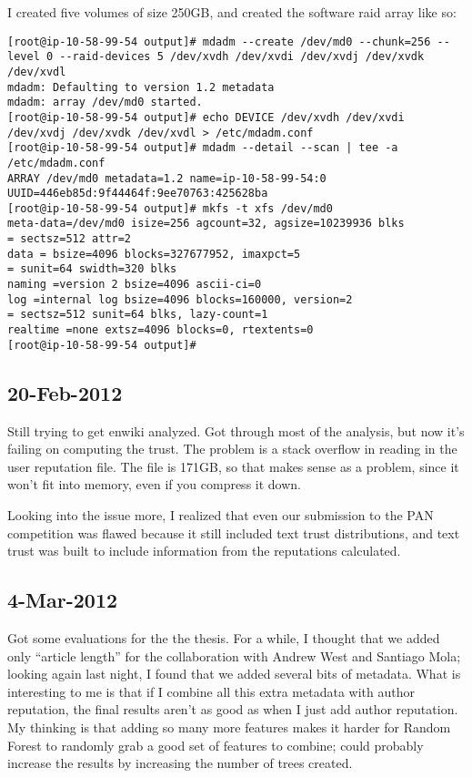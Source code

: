 I created five volumes of size 250GB, and created the software raid
array like so:

\begin{verbatim}
[root@ip-10-58-99-54 output]# mdadm --create /dev/md0 --chunk=256 --level 0 --raid-devices 5 /dev/xvdh /dev/xvdi /dev/xvdj /dev/xvdk /dev/xvdl
mdadm: Defaulting to version 1.2 metadata
mdadm: array /dev/md0 started.
[root@ip-10-58-99-54 output]# echo DEVICE /dev/xvdh /dev/xvdi /dev/xvdj /dev/xvdk /dev/xvdl > /etc/mdadm.conf
[root@ip-10-58-99-54 output]# mdadm --detail --scan | tee -a /etc/mdadm.conf
ARRAY /dev/md0 metadata=1.2 name=ip-10-58-99-54:0
UUID=446eb85d:9f44464f:9ee70763:425628ba
[root@ip-10-58-99-54 output]# mkfs -t xfs /dev/md0
meta-data=/dev/md0 isize=256 agcount=32, agsize=10239936 blks
= sectsz=512 attr=2
data = bsize=4096 blocks=327677952, imaxpct=5
= sunit=64 swidth=320 blks
naming =version 2 bsize=4096 ascii-ci=0
log =internal log bsize=4096 blocks=160000, version=2
= sectsz=512 sunit=64 blks, lazy-count=1
realtime =none extsz=4096 blocks=0, rtextents=0
[root@ip-10-58-99-54 output]#
\end{verbatim}

\subsection{20-Feb-2012}

Still trying to get enwiki analyzed.  Got through most of the analysis,
but now it's failing on computing the trust.
The problem is a stack overflow in reading in the user reputation file.
The file is 171GB, so that makes sense as a problem, since it won't
fit into memory, even if you compress it down.

Looking into the issue more, I realized that even our submission to
the PAN competition was flawed because it still included text trust
distributions, and text trust was built to include information from
the reputations calculated.

\subsection{4-Mar-2012}

Got some evaluations for the the thesis.
For a while, I thought that we added only ``article length'' for the
collaboration with Andrew West and Santiago Mola; looking again last
night, I found that we added several bits of metadata.
What is interesting to me is that if I combine all this extra metadata
with author reputation, the final results aren't as good as when I just
add author reputation.
My thinking is that adding so many more features makes it harder for
Random Forest to randomly grab a good set of features to combine; could
probably increase the results by increasing the number of trees created.

